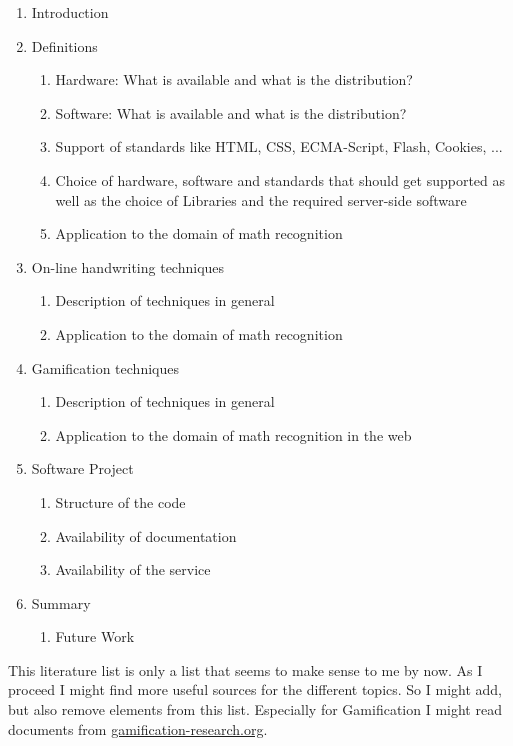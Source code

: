 \documentclass[a4paper]{scrartcl}
\begin{document}
\begin{enumerate}
    \item Introduction
    \item Definitions
    \begin{enumerate}
        \item Hardware: What is available and what is the distribution?
        \item Software: What is available and what is the distribution?
        \item Support of standards like HTML, CSS, ECMA-Script, Flash, Cookies, ...
        \item Choice of hardware, software and standards that should get supported as well as the choice of Libraries and the required server-side software
        \item Application to the domain of math recognition
    \end{enumerate}
    \item On-line handwriting techniques
    \begin{enumerate}
        \item Description of techniques in general
        \item Application to the domain of math recognition
    \end{enumerate}
    \item Gamification techniques
    \begin{enumerate}
        \item Description of techniques in general
        \item Application to the domain of math recognition in the web
    \end{enumerate}
    \item Software Project
    \begin{enumerate}
        \item Structure of the code
        \item Availability of documentation
        \item Availability of the service
    \end{enumerate}
    \item Summary
    \begin{enumerate}
        \item Future Work
    \end{enumerate}
\end{enumerate}
\break

\renewcommand\refname{Related Literature}
\nocite{*}



This literature list is only a list that seems to make sense to me
by now. As I proceed I might find more useful sources for the different
topics. So I might add, but also remove elements from this list.
Especially for Gamification I might read documents from
\href{http://gamification-research.org/}{gamification-research.org}.
\end{document}
